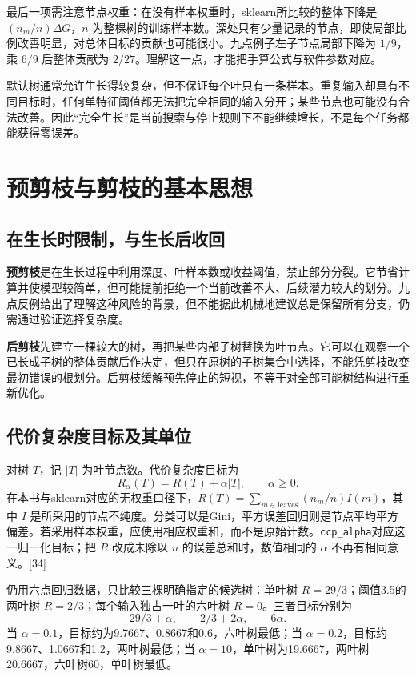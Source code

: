 最后一项需注意节点权重：在没有样本权重时，sklearn所比较的整体下降是 $(n_m/n)\Delta G$，$n$ 为整棵树的训练样本数。深处只有少量记录的节点，即使局部比例改善明显，对总体目标的贡献也可能很小。九点例子左子节点局部下降为 $1/9$，乘 $6/9$ 后整体贡献为 $2/27$。理解这一点，才能把手算公式与软件参数对应。

默认树通常允许生长得较复杂，但不保证每个叶只有一条样本。重复输入却具有不同目标时，任何单特征阈值都无法把完全相同的输入分开；某些节点也可能没有合法改善。因此“完全生长”是当前搜索与停止规则下不能继续增长，不是每个任务都能获得零误差。

\section{预剪枝与剪枝的基本思想}
\subsection{在生长时限制，与生长后收回}
\textbf{预剪枝}是在生长过程中利用深度、叶样本数或收益阈值，禁止部分分裂。它节省计算并使模型较简单，但可能提前拒绝一个当前改善不大、后续潜力较大的划分。九点反例给出了理解这种风险的背景，但不能据此机械地建议总是保留所有分支，仍需通过验证选择复杂度。

\textbf{后剪枝}先建立一棵较大的树，再把某些内部子树替换为叶节点。它可以在观察一个已长成子树的整体贡献后作决定，但只在原树的子树集合中选择，不能凭剪枝改变最初错误的根划分。后剪枝缓解预先停止的短视，不等于对全部可能树结构进行重新优化。

\subsection{代价复杂度目标及其单位}
对树 $T$，记 $|T|$ 为叶节点数。代价复杂度目标为
\begin{equation}
R_\alpha(T)=R(T)+\alpha|T|,\qquad \alpha\geq0.
\label{eq:tree-ccp}
\end{equation}
在本书与sklearn对应的无权重口径下，$R(T)=\sum_{m\in\mathrm{leaves}}(n_m/n)I(m)$，其中 $I$ 是所采用的节点不纯度。分类可以是Gini，平方误差回归则是节点平均平方偏差。若采用样本权重，应使用相应权重和，而不是原始计数。\texttt{ccp\_alpha}对应这一归一化目标；把 $R$ 改成未除以 $n$ 的误差总和时，数值相同的 $\alpha$ 不再有相同意义。[34]

仍用六点回归数据，只比较三棵明确指定的候选树：单叶树 $R=29/3$；阈值3.5的两叶树 $R=2/3$；每个输入独占一叶的六叶树 $R=0$。三者目标分别为
\[
29/3+\alpha,\qquad 2/3+2\alpha,\qquad6\alpha.
\]
当 $\alpha=0.1$，目标约为9.7667、0.8667和0.6，六叶树最低；当 $\alpha=0.2$，目标约9.8667、1.0667和1.2，两叶树最低；当 $\alpha=10$，单叶树为19.6667，两叶树20.6667，六叶树60，单叶树最低。

